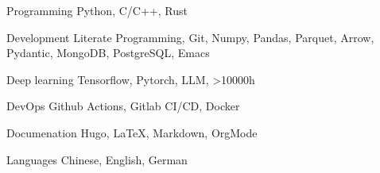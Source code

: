 \documentclass[../cv.tex]{subfiles}
\begin{document}


\begin{cvskills}

  \cvskill
    {Programming} %
    {Python, C/C++, Rust} %

  \cvskill
    {Development} %
    {Literate Programming, Git, Numpy, Pandas, Parquet, Arrow, Pydantic, MongoDB, PostgreSQL, Emacs} %

  \cvskill
    {Deep learning} %
    {Tensorflow, Pytorch, LLM, >10000h} %

  \cvskill
    {DevOps} %
    {Github Actions, Gitlab CI/CD, Docker} %

  \cvskill
    {Documenation} %
    {Hugo, LaTeX, Markdown, OrgMode} %

  \cvskill
    {Languages} %
    {Chinese, English, German} %

\end{cvskills}
\end{document}
